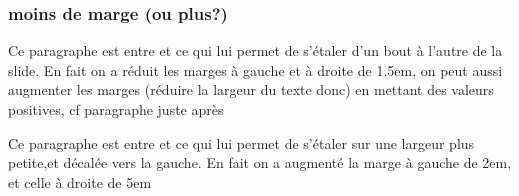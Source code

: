 \begin{frame}
  \frametitle{moins de marge (ou plus?)}

  \begin{adjustwidth}{-1.5 em}{-1.5em}
    Ce paragraphe est entre 
    \lin{\begin{adjustwidth}{-1.5 em}{-1.5em}} et \lin{\end{adjustwidth}}
    ce qui lui permet de s'étaler  d'un bout à l'autre de la slide.
    En fait on a réduit les marges à gauche et à droite de 1.5em,
    on peut aussi augmenter les marges (réduire la largeur du texte donc) en mettant des valeurs positives, cf paragraphe juste après
  \end{adjustwidth}
  
  \bigskip
  
  \begin{adjustwidth}{2 em}{5em}
    Ce paragraphe est entre 
    \lin{\begin{adjustwidth}{2 em}{5em}} et \lin{\end{adjustwidth}}
    ce qui lui permet de s'étaler sur une largeur plus petite,et décalée vers la gauche.
    En fait on a augmenté la marge à gauche de 2em, et celle à droite de 5em
  \end{adjustwidth}
\end{frame}




